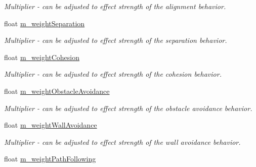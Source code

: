 \begin{DoxyCompactItemize}
\begin{DoxyCompactList}\small\item\em Multiplier -\/ can be adjusted to effect strength of the alignment behavior. \end{DoxyCompactList}\item 
\hypertarget{classsteer_1_1_super_component_a6a40ec5da6af1b7f36ba023c28456972}{float \hyperlink{classsteer_1_1_super_component_a6a40ec5da6af1b7f36ba023c28456972}{m\-\_\-weight\-Separation}}\label{classsteer_1_1_super_component_a6a40ec5da6af1b7f36ba023c28456972}

\begin{DoxyCompactList}\small\item\em Multiplier -\/ can be adjusted to effect strength of the separation behavior. \end{DoxyCompactList}\item 
\hypertarget{classsteer_1_1_super_component_af026be44b85a808ebf9eca9e8bb2f070}{float \hyperlink{classsteer_1_1_super_component_af026be44b85a808ebf9eca9e8bb2f070}{m\-\_\-weight\-Cohesion}}\label{classsteer_1_1_super_component_af026be44b85a808ebf9eca9e8bb2f070}

\begin{DoxyCompactList}\small\item\em Multiplier -\/ can be adjusted to effect strength of the cohesion behavior. \end{DoxyCompactList}\item 
\hypertarget{classsteer_1_1_super_component_ab38d5c6fa86e882bef3258d4ee5542f4}{float \hyperlink{classsteer_1_1_super_component_ab38d5c6fa86e882bef3258d4ee5542f4}{m\-\_\-weight\-Obstacle\-Avoidance}}\label{classsteer_1_1_super_component_ab38d5c6fa86e882bef3258d4ee5542f4}

\begin{DoxyCompactList}\small\item\em Multiplier -\/ can be adjusted to effect strength of the obstacle avoidance behavior. \end{DoxyCompactList}\item 
\hypertarget{classsteer_1_1_super_component_a801a719fc8fcec34ec4a8ef0b6c11800}{float \hyperlink{classsteer_1_1_super_component_a801a719fc8fcec34ec4a8ef0b6c11800}{m\-\_\-weight\-Wall\-Avoidance}}\label{classsteer_1_1_super_component_a801a719fc8fcec34ec4a8ef0b6c11800}

\begin{DoxyCompactList}\small\item\em Multiplier -\/ can be adjusted to effect strength of the wall avoidance behavior. \end{DoxyCompactList}\item 
\hypertarget{classsteer_1_1_super_component_aab01c9677fa02f20cccb8a7c74a8c7a8}{float \hyperlink{classsteer_1_1_super_component_aab01c9677fa02f20cccb8a7c74a8c7a8}{m\-\_\-weight\-Path\-Following}}\label{classsteer_1_1_super_component_aab01c9677fa02f20cccb8a7c74a8c7a8}


\end{DoxyCompactItemize}
